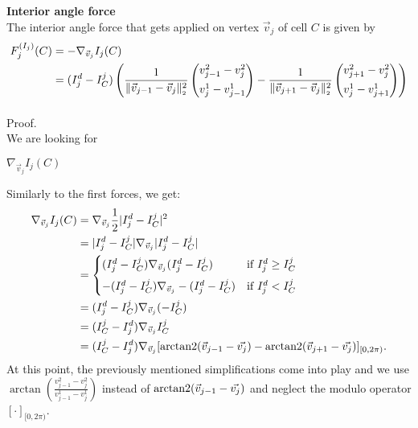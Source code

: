 \begin{proposition} \textbf{Interior angle force} \\

	The interior angle force that gets applied on vertex $\vec{v}_j$ of cell $C$ is given by 
	\begin{align}
		F^{(I_{j})}_j(C) &= - \nabla_{\vec{v}_j} I_{j}(C) \\
		&= (I_{j}^d - I^{j}_{C}) \left( 
		\frac{1}{\norm[\vec{v}_{j-1} - \vec{v}_j]^2} \begin{pmatrix}
		  v_{j-1}^2 - v_{j}^2 \\[0.5em]
		  v_{j}^1 - v_{j-1}^1
	  \end{pmatrix} 
	  - \frac{1}{\norm[\vec{v}_{j+1} - \vec{v}_j]^2} \begin{pmatrix}
		  v_{j+1}^2 - v_{j}^2 \\[0.5em]
		  v_{j}^1 - v_{j+1}^1
	  \end{pmatrix} 
	  \right) \notag \\[0.5em] 
	\end{align}


	Proof. \\
	We are looking for 
	\begin{center}
		$
		\nabla_{\vec{v}_j} I_{j}(C)
		$
	\end{center}
	
	Similarly to the first forces, we get:
	\begin{align*}
		\nabla_{\vec{v}_j}  I_{j}(C) &=  \nabla_{\vec{v}_j} \frac{1}{2}|I^d_j - I^j_{C}|^2 \\
		&= |I_{j}^d - I^j_{C}| \nabla_{\vec{v}_j} |I^d_j - I^j_{C}| \\
		&=  \begin{cases}
				(I_{j}^d - I^j_{C}) \nabla_{\vec{v}_j} (I^d_j - I^j_{C}) &\text{if } I_{j}^d \geq I^j_{C}\\[0.5em]
				- (I_{j}^d - I^j_{C}) \nabla_{\vec{v}_j} - (I^d_j - I^j_{C}) &\text{if } I_{j}^d < I^j_{C}
		    \end{cases} \\
		&= (I_{j}^d - I^j_{C}) \nabla_{\vec{v}_j} (- I^j_{C})\\
		&= (I^j_{C} - I_{j}^d) \nabla_{\vec{v}_j}  I^j_{C}   \\
		&= (I^j_{C} - I_{j}^d) \nabla_{\vec{v}_j} [\operatorname{arctan2}(\vec{v}_{j-1} - \vec{v_j}) - \operatorname{arctan2}(\vec{v}_{j+1} - \vec{v_j})]_{[0,2\pi)}.
	\end{align*}
	At this point, the previously mentioned simplifications come into play and we use $\arctan \left(\frac{v_{j-1}^2 - v_{j}^2}{v_{j-1}^1 - v_{j}^1} \right)$ instead of $\operatorname{arctan2}(\vec{v}_{j-1} - \vec{v_j})$ and neglect the modulo operator $[\cdot]_{[0, 2\pi)}$.


\end{proposition}
